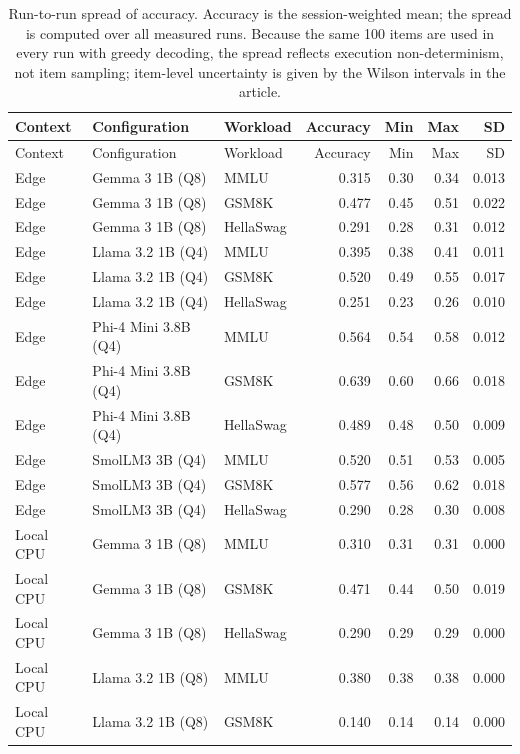 \begin{longtable}{@{}l l l r r r r@{}}
\caption{Run-to-run spread of accuracy. Accuracy is the session-weighted mean; the spread is computed over all measured runs. Because the same 100 items are used in every run with greedy decoding, the spread reflects execution non-determinism, not item sampling; item-level uncertainty is given by the Wilson intervals in the article.}\label{tab:s4}\\
\toprule
Context & Configuration & Workload & Accuracy & Min & Max & SD \\
\midrule\endfirsthead
\toprule
Context & Configuration & Workload & Accuracy & Min & Max & SD \\
\midrule\endhead
\bottomrule\endfoot
Edge & Gemma 3 1B (Q8) & MMLU & 0.315 & 0.30 & 0.34 & 0.013 \\
Edge & Gemma 3 1B (Q8) & GSM8K & 0.477 & 0.45 & 0.51 & 0.022 \\
Edge & Gemma 3 1B (Q8) & HellaSwag & 0.291 & 0.28 & 0.31 & 0.012 \\
Edge & Llama 3.2 1B (Q4) & MMLU & 0.395 & 0.38 & 0.41 & 0.011 \\
Edge & Llama 3.2 1B (Q4) & GSM8K & 0.520 & 0.49 & 0.55 & 0.017 \\
Edge & Llama 3.2 1B (Q4) & HellaSwag & 0.251 & 0.23 & 0.26 & 0.010 \\
Edge & Phi-4 Mini 3.8B (Q4) & MMLU & 0.564 & 0.54 & 0.58 & 0.012 \\
Edge & Phi-4 Mini 3.8B (Q4) & GSM8K & 0.639 & 0.60 & 0.66 & 0.018 \\
Edge & Phi-4 Mini 3.8B (Q4) & HellaSwag & 0.489 & 0.48 & 0.50 & 0.009 \\
Edge & SmolLM3 3B (Q4) & MMLU & 0.520 & 0.51 & 0.53 & 0.005 \\
Edge & SmolLM3 3B (Q4) & GSM8K & 0.577 & 0.56 & 0.62 & 0.018 \\
Edge & SmolLM3 3B (Q4) & HellaSwag & 0.290 & 0.28 & 0.30 & 0.008 \\
\midrule
Local CPU & Gemma 3 1B (Q8) & MMLU & 0.310 & 0.31 & 0.31 & 0.000 \\
Local CPU & Gemma 3 1B (Q8) & GSM8K & 0.471 & 0.44 & 0.50 & 0.019 \\
Local CPU & Gemma 3 1B (Q8) & HellaSwag & 0.290 & 0.29 & 0.29 & 0.000 \\
Local CPU & Llama 3.2 1B (Q8) & MMLU & 0.380 & 0.38 & 0.38 & 0.000 \\
Local CPU & Llama 3.2 1B (Q8) & GSM8K & 0.140 & 0.14 & 0.14 & 0.000 \\

\end{longtable}
